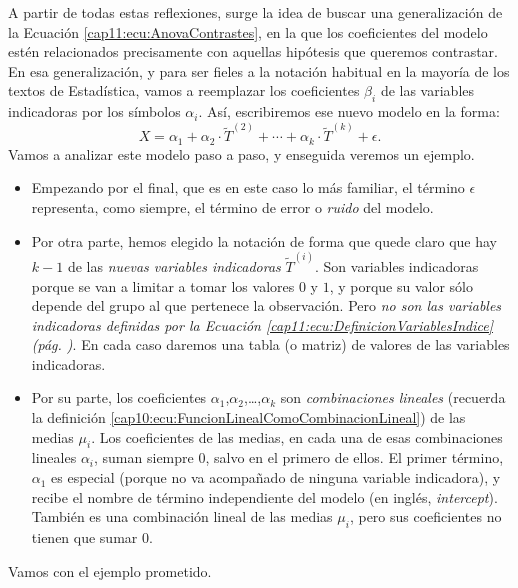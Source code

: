 A partir de todas estas reflexiones, surge la idea de buscar una generalización de la Ecuación \ref{cap11:ecu:AnovaContrastes}, en la que los coeficientes del modelo estén relacionados precisamente con aquellas hipótesis que queremos contrastar. En esa generalización, y para ser fieles a la notación habitual en la mayoría de los textos de Estadística, vamos a reemplazar los coeficientes $\beta_i$ de las variables indicadoras por los símbolos $\alpha_i$.  Así, escribiremos ese nuevo modelo en la forma:
\begin{equation}
\label{cap11:ecu:AnovamodeloLinealUsandoContrastes}
X= \alpha_1 + \alpha_2\cdot \tilde{T}^{(2)}+\cdots+  \alpha_k\cdot \tilde{T}^{(k)} +\epsilon.
\end{equation}
Vamos a analizar este modelo paso a paso, y enseguida veremos un ejemplo.
\begin{itemize}
  \item Empezando por el final, que es en este caso lo más familiar, el término $\epsilon$ representa, como siempre, el término de error o {\em ruido} del modelo.
  \item  Por otra parte, hemos elegido la notación de forma que quede claro que hay $k-1$ de las  {\em nuevas variables indicadoras} $\tilde T^{(i)}$. Son variables indicadoras porque se van a limitar a tomar los valores $0$ y $1$, y porque su valor sólo depende del grupo al que pertenece la observación. Pero {\em no son las variables indicadoras definidas por la Ecuación \ref{cap11:ecu:DefinicionVariablesIndice} (pág. \pageref{cap11:ecu:DefinicionVariablesIndice})}. En cada caso daremos una tabla (o matriz) de valores de las variables indicadoras.
  \item Por su parte, los coeficientes $\alpha_1$,$\alpha_2$,\ldots,$\alpha_k$  son {\em combinaciones lineales} (recuerda la definición \ref{cap10:ecu:FuncionLinealComoCombinacionLineal}) de las medias $\mu_i$. Los coeficientes de las medias, en cada una de esas combinaciones lineales $\alpha_i$, suman siempre $0$, salvo en el primero de ellos. El primer término, $\alpha_1$ es especial (porque no va acompañado de ninguna variable indicadora), y recibe el nombre de {\sf término independiente} del modelo (en inglés, {\em intercept}). También es una combinación lineal de las medias $\mu_i$, pero sus coeficientes no tienen que sumar $0$.

\end{itemize}
Vamos con el ejemplo prometido.

